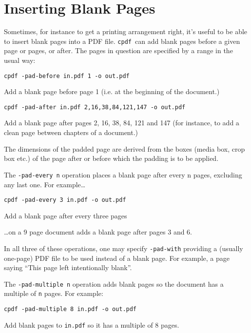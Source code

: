 \documentclass{book}
\newcommand{\cpdf}{\texttt{cpdf}}
\begin{document}
  \section{Inserting Blank Pages}
  Sometimes, for instance to get a printing arrangement right, it's useful to
be able to insert blank pages into a PDF file. \cpdf\ can add blank pages
before a given page or pages, or after. The pages in question are specified by
a range in the usual way:
  \begin{framed}
    \small\verb!cpdf -pad-before in.pdf 1 -o out.pdf!
 
    \vspace{2.5mm}
    \noindent Add a blank page before page 1 (i.e. at the beginning of the document.)

    \vspace{2.5mm}
    \verb!cpdf -pad-after in.pdf 2,16,38,84,121,147 -o out.pdf!

    \vspace{2.5mm}
    \noindent Add a blank page after pages 2, 16, 38, 84, 121 and 147 (for
instance, to add a clean page between chapters of a document.)
  \end{framed}
  \noindent The dimensions of the padded page are derived from the boxes (media box, crop box etc.) of the page after or before which the padding is to be applied.

  The \verb!-pad-every n! operation places a blank page after every n pages, excluding any last one. For example\ldots
  \begin{framed}
    \small\verb!cpdf -pad-every 3 in.pdf -o out.pdf!
 
    \vspace{2.5mm}
    \noindent Add a blank page after every three pages
  \end{framed}
  \noindent\ldots on a 9 page document adds a blank page after pages 3 and 6.

In all three of these operations, one may specify \texttt{-pad-with} providing a (usually one-page)  PDF file to be used instead of a blank page. For example, a page saying ``This page left intentionally blank''.

  The \verb!-pad-multiple n! operation adds blank pages so the document has a multiple of \verb!n! pages. For example:
  \begin{framed}
    \small\verb!cpdf -pad-multiple 8 in.pdf -o out.pdf!
 
    \vspace{2.5mm}
    \noindent Add blank pages to \texttt{in.pdf} so it has a multiple of 8 pages. 
  \end{framed}
 
\end{document}
